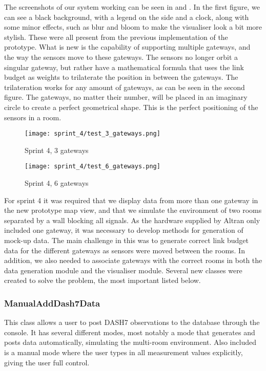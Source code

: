 \documentclass[../document]{subfiles}
\begin{document}
The screenshots of our system working can be seen in  and  . In the first figure, we can see a black background, with a legend on the side and a clock, along with some minor effects, such as blur and bloom to make the visualiser look a bit more stylish. These were all present from the previous implementation of the prototype. What is new is the capability of supporting multiple gateways, and the way the sensors move to these gateways. The sensors no longer orbit a singular gateway, but rather have a mathematical formula that uses the link budget as weights to trilaterate the position in between the gateways. The trilateration works for any amount of gateways, as can be seen in the second figure. The gateways, no matter their number, will be placed in an imaginary circle to create a perfect geometrical shape. This is the perfect positioning of the sensors in a room.

\begin{figure}[H]
\centering
\texttt{[image: sprint\_4/test\_3\_gateways.png]}
\caption{Sprint 4, 3 gateways}
\label{fig:sprint4_1}
\end{figure}

\begin{figure}[H]
\centering
\texttt{[image: sprint\_4/test\_6\_gateways.png]}
\caption{Sprint 4, 6 gateways}
\label{fig:sprint4_2}
\end{figure}

For sprint 4 it was required that we display data from more than one gateway in the new prototype map view, and that we simulate the environment of two rooms separated by a wall blocking all signals. As the hardware supplied by Altran only included one gateway, it was necessary to develop methods for generation of mock-up data. The main challenge in this was to generate correct link budget data for the different gateways as sensors were moved between the rooms. In addition, we also needed to associate gateways with the correct rooms in both the data generation module and the visualiser module. Several new classes were created to solve the problem, the most important listed below.

\subsubsection{ManualAddDash7Data}
This class allows a user to post DASH7 observations to the database through the console. It has several different modes, most notably a mode that generates and posts data automatically, simulating the multi-room environment. Also included is a manual mode where the user types in all measurement values explicitly, giving the user full control.
\end{document}
